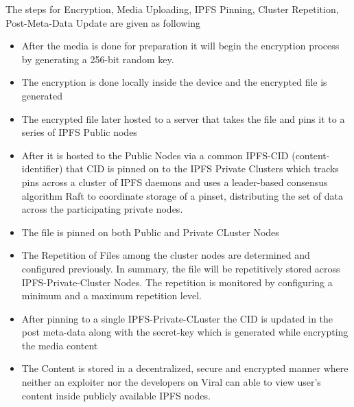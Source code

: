 \documentclass[conference]{IEEEtran}
\begin{document}
The steps for Encryption, Media Uploading, IPFS Pinning, Cluster Repetition, Post-Meta-Data Update are given as following
\begin{itemize}[wide, labelwidth=!, labelindent=0pt]
\item After the media is done for preparation it will begin the encryption process by generating a 256-bit random key.
\item The encryption is done locally inside the device and the encrypted file is generated
\item The encrypted file later hosted to a server that takes the file and pins it to a series of IPFS Public nodes
\item After it is hosted to the Public Nodes via a common IPFS-CID (content-identifier) that CID is pinned on to the IPFS Private Clusters which tracks pins across a cluster of IPFS daemons and uses a leader-based consensus algorithm Raft to coordinate storage of a pinset, distributing the set of data across the participating private nodes.
\item The file is pinned on both Public and Private CLuster Nodes
\item The Repetition of Files among the cluster nodes are determined and configured previously. In summary, the file will be repetitively stored across IPFS-Private-Cluster Nodes. The repetition is monitored by configuring a minimum and a maximum repetition level.
\item After pinning to a single IPFS-Private-CLuster the CID is updated in the post meta-data along with the secret-key which is generated while encrypting the media content
\item The Content is stored in a decentralized, secure and encrypted manner where neither an exploiter nor the developers on Viral can able to view user's content inside publicly available IPFS nodes.
\end{itemize}
\end{document}

